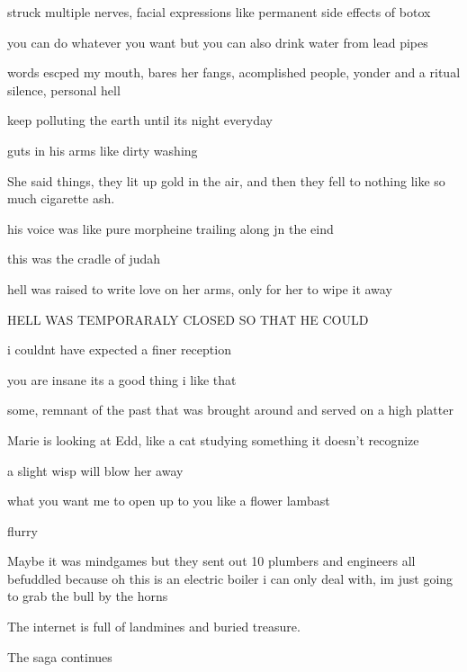 struck multiple nerves, facial expressions like permanent side effects of botox

you can do whatever you want but you can also drink water from lead pipes

words escped my mouth, bares her fangs, acomplished people, yonder and a ritual silence, personal hell

keep polluting the earth until its night everyday

guts in his arms like dirty washing

She said things, they lit up gold in the air, and then they fell to nothing like so much cigarette ash.

his voice was like pure morpheine trailing along jn the eind

this was the cradle of judah

hell was raised to write love on her arms, only for her to wipe it away

HELL WAS TEMPORARALY CLOSED SO THAT HE COULD

i couldnt have expected a finer reception

you are insane
its a good thing i like that

some, remnant of the past that was brought around and served on a high platter

Marie is looking at Edd, like a cat studying something it doesn't recognize

a slight wisp will blow her away

what you want me to open up to you like a flower lambast

flurry

Maybe it was mindgames but they sent out 10 plumbers and engineers all befuddled because oh this is an electric boiler i can only deal with, im just going to grab the bull by the horns

The internet is full of landmines and buried treasure.

The saga continues
